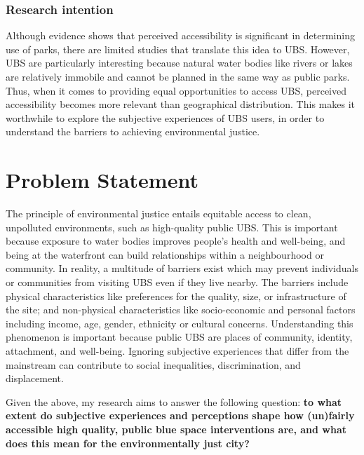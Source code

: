 \documentclass{article}
\begin{document}

\subsubsection{Research intention}

Although evidence shows that perceived accessibility is significant in determining use of parks, there are limited studies that translate this idea to UBS.
However, UBS are particularly interesting because natural water bodies like rivers or lakes are relatively immobile and cannot be planned in the same way as public parks. 
Thus, when it comes to providing equal opportunities to access UBS, perceived accessibility becomes more relevant than geographical distribution. 
This makes it worthwhile to explore the subjective experiences of UBS users, in order to understand the barriers to achieving environmental justice.


\section{Problem Statement}

The principle of environmental justice entails equitable access to clean, unpolluted environments, such as high-quality public UBS. This is important because exposure to water bodies improves people's health and well-being, and being at the waterfront can build relationships within a neighbourhood or community.
In reality, a multitude of barriers exist which may prevent individuals or communities from visiting UBS even if they live nearby. The barriers include physical characteristics like preferences for the quality, size, or infrastructure of the site; and non-physical characteristics like socio-economic and personal factors including income, age, gender, ethnicity or cultural concerns.
Understanding this phenomenon is important because public UBS are places of community, identity, attachment, and well-being. Ignoring subjective experiences that differ from the mainstream can contribute to social inequalities, discrimination, and displacement.

Given the above, my research aims to answer the following question: \textbf{to what extent do subjective experiences and perceptions shape how (un)fairly accessible high quality, public blue space interventions are, and what does this mean for the environmentally just city?}
\end{document}
